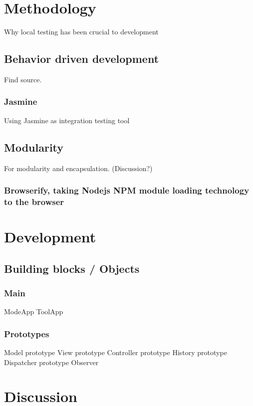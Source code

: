 \documentclass[english]{article}
\begin{document}
\section{Methodology}
Why local testing has been crucial to development 

\subsection{Behavior driven development}
Find source.

\subsubsection{Jasmine}
Using Jasmine as integration testing tool

\subsection{Modularity}
For modularity and encapsulation. (Discussion?)
\subsubsection{Browserify, taking Nodejs NPM module loading technology to the browser}

\section{Development}
\subsection{Building blocks / Objects}
\subsubsection{Main}
ModeApp
ToolApp
\subsubsection{Prototypes}
Model prototype
View prototype
Controller prototype
History prototype
Dispatcher prototype
Observer



\section{Discussion}
\end{document}
